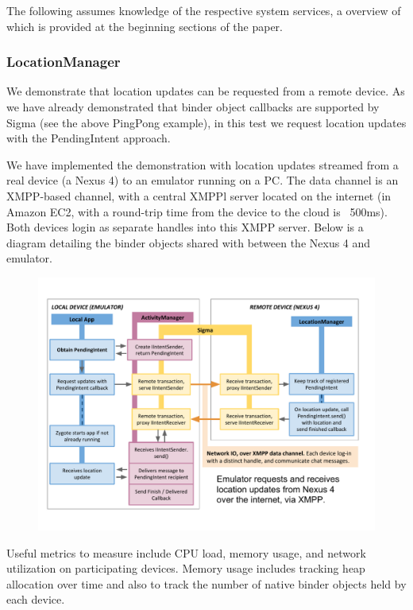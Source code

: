 \documentclass[prodmode]{acmlarge}
\begin{document}
The following assumes knowledge of the respective system services, a overview of which is provided at the beginning sections of the paper.

\subsubsection{LocationManager}
We demonstrate that location updates can be requested from a remote device. As we have already demonstrated that binder object callbacks are supported by Sigma (see the above PingPong example), in this test we request location updates with the PendingIntent approach.

We have implemented the demonstration with location updates streamed from a real device (a Nexus 4) to an emulator running on a PC. The data channel is an XMPP-based channel, with a central XMPPl server located on the internet (in Amazon EC2, with a round-trip time from the device to the cloud is ~500ms). Both devices login as separate handles into this XMPP server.
Below is a diagram detailing the binder objects shared with between the Nexus 4 and emulator.

\begin{figure}[h]
\centering
\includegraphics[width=\textwidth]{drawings/LocationPendingIntentExample.pdf}
\end{figure}

Useful metrics to measure include CPU load, memory usage, and network utilization on participating devices. Memory usage includes tracking heap allocation over time and also to track the number of native binder objects held by each device. 
\end{document}
